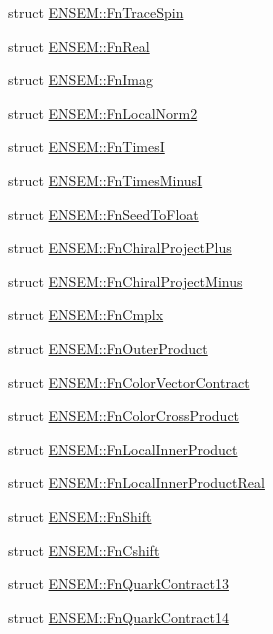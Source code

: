 \begin{DoxyCompactItemize}
struct \mbox{\hyperlink{structENSEM_1_1FnTraceSpin}{E\+N\+S\+E\+M\+::\+Fn\+Trace\+Spin}}
\item 
struct \mbox{\hyperlink{structENSEM_1_1FnReal}{E\+N\+S\+E\+M\+::\+Fn\+Real}}
\item 
struct \mbox{\hyperlink{structENSEM_1_1FnImag}{E\+N\+S\+E\+M\+::\+Fn\+Imag}}
\item 
struct \mbox{\hyperlink{structENSEM_1_1FnLocalNorm2}{E\+N\+S\+E\+M\+::\+Fn\+Local\+Norm2}}
\item 
struct \mbox{\hyperlink{structENSEM_1_1FnTimesI}{E\+N\+S\+E\+M\+::\+Fn\+TimesI}}
\item 
struct \mbox{\hyperlink{structENSEM_1_1FnTimesMinusI}{E\+N\+S\+E\+M\+::\+Fn\+Times\+MinusI}}
\item 
struct \mbox{\hyperlink{structENSEM_1_1FnSeedToFloat}{E\+N\+S\+E\+M\+::\+Fn\+Seed\+To\+Float}}
\item 
struct \mbox{\hyperlink{structENSEM_1_1FnChiralProjectPlus}{E\+N\+S\+E\+M\+::\+Fn\+Chiral\+Project\+Plus}}
\item 
struct \mbox{\hyperlink{structENSEM_1_1FnChiralProjectMinus}{E\+N\+S\+E\+M\+::\+Fn\+Chiral\+Project\+Minus}}
\item 
struct \mbox{\hyperlink{structENSEM_1_1FnCmplx}{E\+N\+S\+E\+M\+::\+Fn\+Cmplx}}
\item 
struct \mbox{\hyperlink{structENSEM_1_1FnOuterProduct}{E\+N\+S\+E\+M\+::\+Fn\+Outer\+Product}}
\item 
struct \mbox{\hyperlink{structENSEM_1_1FnColorVectorContract}{E\+N\+S\+E\+M\+::\+Fn\+Color\+Vector\+Contract}}
\item 
struct \mbox{\hyperlink{structENSEM_1_1FnColorCrossProduct}{E\+N\+S\+E\+M\+::\+Fn\+Color\+Cross\+Product}}
\item 
struct \mbox{\hyperlink{structENSEM_1_1FnLocalInnerProduct}{E\+N\+S\+E\+M\+::\+Fn\+Local\+Inner\+Product}}
\item 
struct \mbox{\hyperlink{structENSEM_1_1FnLocalInnerProductReal}{E\+N\+S\+E\+M\+::\+Fn\+Local\+Inner\+Product\+Real}}
\item 
struct \mbox{\hyperlink{structENSEM_1_1FnShift}{E\+N\+S\+E\+M\+::\+Fn\+Shift}}
\item 
struct \mbox{\hyperlink{structENSEM_1_1FnCshift}{E\+N\+S\+E\+M\+::\+Fn\+Cshift}}
\item 
struct \mbox{\hyperlink{structENSEM_1_1FnQuarkContract13}{E\+N\+S\+E\+M\+::\+Fn\+Quark\+Contract13}}
\item 
struct \mbox{\hyperlink{structENSEM_1_1FnQuarkContract14}{E\+N\+S\+E\+M\+::\+Fn\+Quark\+Contract14}}

\end{DoxyCompactItemize}
